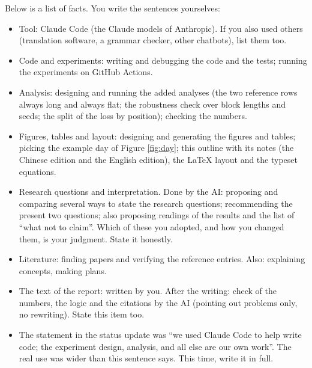 \documentclass{article}
\newenvironment{pts}{\begin{itemize}[nosep,leftmargin=1.15em,topsep=1pt]}{\end{itemize}}
\begin{document}
\begin{note}
Below is a list of facts. You write the sentences yourselves:
\begin{pts}
\item Tool: Claude Code (the Claude models of Anthropic). If you also used others (translation software, a grammar checker, other chatbots), list them too.
\item Code and experiments: writing and debugging the code and the tests; running the experiments on GitHub Actions.
\item Analysis: designing and running the added analyses (the two reference rows always long and always flat; the robustness check over block lengths and seeds; the split of the loss by position); checking the numbers.
\item Figures, tables and layout: designing and generating the figures and tables; picking the example day of Figure \ref{fig:day}; this outline with its notes (the Chinese edition and the English edition), the LaTeX layout and the typeset equations.
\item Research questions and interpretation. Done by the AI: proposing and comparing several ways to state the research questions; recommending the present two questions; also proposing readings of the results and the list of ``what not to claim''. Which of these you adopted, and how you changed them, is your judgment. State it honestly.
\item Literature: finding papers and verifying the reference entries. Also: explaining concepts, making plans.
\item The text of the report: written by you. After the writing: check of the numbers, the logic and the citations by the AI (pointing out problems only, no rewriting). State this item too.
\item The statement in the status update was ``we used Claude Code to help write code; the experiment design, analysis, and all else are our own work''. The real use was wider than this sentence says. This time, write it in full.
\end{pts}
\end{note}



\end{document}
